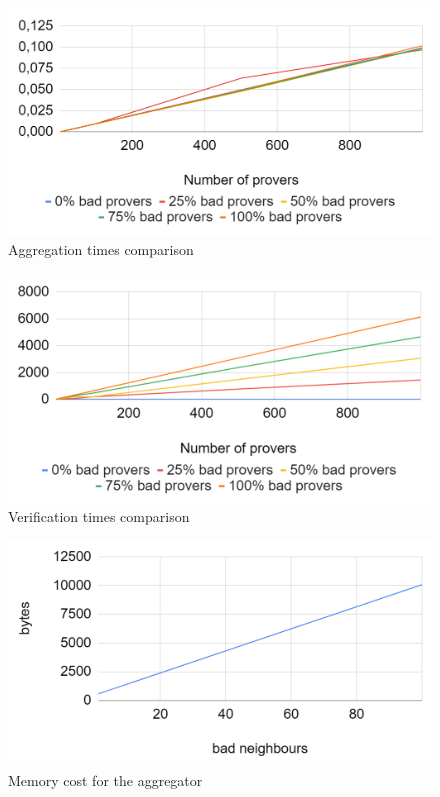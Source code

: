 \begin{figure}
  \centering
  \includegraphics[width=.90\linewidth]{Images/aggregation.png}  
  \caption{Aggregation times comparison}
  \label{fig:aggregation_comparison}
\end{figure}
\begin{figure}
  \centering
  \includegraphics[width=.90\linewidth]{Images/verification.png}  
  \caption{Verification times comparison}
  \label{fig:verification_comparison}
\end{figure}
\begin{figure}
  \centering
	\includegraphics[width=.90\linewidth]{Images/memory_cost.png} 
	\caption{Memory cost for the aggregator} 
  \label{fig:memory_cost}
\end{figure}

